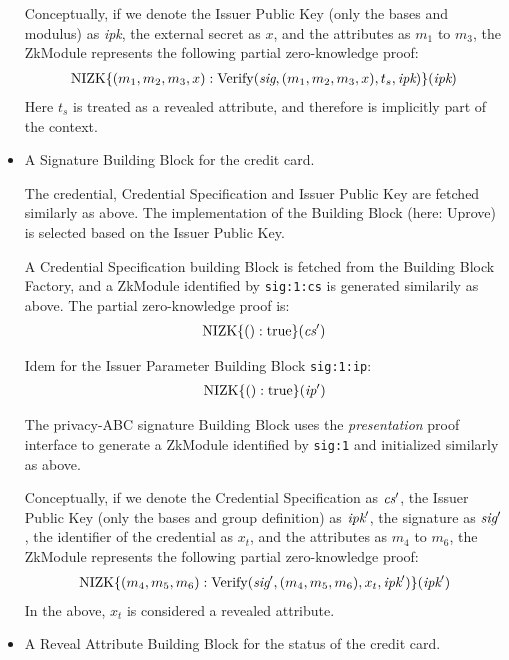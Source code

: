 \begin{itemize}
Conceptually, if we denote the Issuer Public Key (only the bases and modulus) as \emph{ipk},
the external secret as $x$, and the attributes as $m_1$ to $m_3$,
the ZkModule represents the following partial zero-knowledge proof:
\begin{align}
\operatorname{NIZK}\lbrace(m_1, m_2, m_3, x): \operatorname{Verify}(\emph{sig}, (m_1, m_2, m_3, x), t_s, \emph{ipk})\rbrace(\emph{ipk})
\end{align}
Here $t_s$ is treated as a revealed attribute, and therefore is implicitly part of the context.

\item A Signature Building Block for the credit card.

The
credential, Credential Specification and Issuer Public Key are fetched similarly as above.
The implementation of the Building Block (here: Uprove)
is selected based on the Issuer Public Key.

A Credential Specification building Block is fetched from the Building Block Factory, and a ZkModule identified by
\texttt{sig:1:cs} is generated similarily as above.
The partial zero-knowledge proof is:
\begin{align}
\operatorname{NIZK}\lbrace(): \operatorname{true}\rbrace(\emph{cs}')
\end{align}

Idem for the Issuer Parameter Building Block
\texttt{sig:1:ip}:
\begin{align}
\operatorname{NIZK}\lbrace(): \operatorname{true}\rbrace(\emph{ip}')
\end{align}

The privacy-ABC signature Building Block uses the \emph{presentation} proof interface to generate a ZkModule
identified by \texttt{sig:1} and initialized similarly as above.

Conceptually, if we denote the Credential Specification as $\emph{cs}'$, the Issuer Public Key (only the bases and group definition) as $\emph{ipk}'$,
the signature as $\emph{sig}'$, the identifier of the credential as $x_t$,
and the attributes as $m_4$ to $m_6$,
the ZkModule represents the following partial zero-knowledge proof:
\begin{align}
\operatorname{NIZK}\lbrace(m_4, m_5, m_6): \operatorname{Verify}(\emph{sig}', (m_4, m_5, m_6), x_t, \emph{ipk}')\rbrace(\emph{ipk}')
\end{align}
In the above, $x_t$ is considered a revealed attribute.

\item A Reveal Attribute Building Block for the status of the credit card.


\end{itemize}
